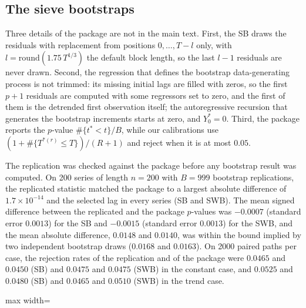 \documentclass[11pt]{article}
\newcommand{\rw}{Y}
\newcommand{\RMGLS}{MSB-B}
\begin{document}
\subsection*{The sieve bootstraps}

Three details of the package are not in the main text. First, the SB draws the residuals with replacement from positions $0, \dots, T - l$ only, with $l = \mathrm{round}(1.75\,T^{1/3})$ the default block length, so the last $l - 1$ residuals are never drawn. Second, the regression that defines the bootstrap data-generating process is not trimmed: its missing initial lags are filled with zeros, so the first $p + 1$ residuals are computed with some regressors set to zero, and the first of them is the detrended first observation itself; the autoregressive recursion that generates the bootstrap increments starts at zero, and $\rw^*_0 = 0$. Third, the package reports the $p$-value $\#\{t^* < t\}/B$, while our calibrations use $(1 + \#\{T^{*(r)} \leq T\})/(R + 1)$ and reject when it is at most $0.05$.

The replication was checked against the package before any bootstrap result was computed. On 200 series of length $n = 200$ with $B = 999$ bootstrap replications, the replicated statistic matched the package to a largest absolute difference of $1.7\times10^{-14}$ and the selected lag in every series (SB and SWB). The mean signed difference between the replicated and the package $p$-values was $-0.0007$ (standard error $0.0013$) for the SB and $-0.0015$ (standard error $0.0013$) for the SWB, and the mean absolute difference, $0.0148$ and $0.0140$, was within the bound implied by two independent bootstrap draws ($0.0168$ and $0.0163$). On 2000 paired paths per case, the rejection rates of the replication and of the package were $0.0465$ and $0.0450$ (SB) and $0.0475$ and $0.0475$ (SWB) in the constant case, and $0.0525$ and $0.0480$ (SB) and $0.0465$ and $0.0510$ (SWB) in the trend case.

\begin{table}[htbp]
\centering
\caption{Size of \RMGLS{} with a fixed Bartlett bandwidth.}
\label{tab:fixedbsize}
\small
\begin{adjustbox}{max width=\textwidth}

\end{adjustbox}
\par\medskip\begin{minipage}{\textwidth}\footnotesize

\end{minipage}
\end{table}
\end{document}
